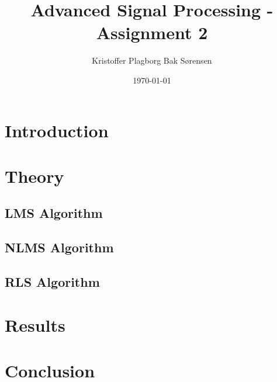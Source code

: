 \documentclass[]{article}
\title{Advanced Signal Processing - Assignment 2}
\author{Kristoffer Plagborg Bak Sørensen}
\date{\today}
\begin{document}
\tableofcontents

\section{Introduction}

\section{Theory}

\subsection{LMS Algorithm}

\subsection{NLMS Algorithm}

\subsection{RLS Algorithm}

\section{Results}

\section{Conclusion}
\end{document}
